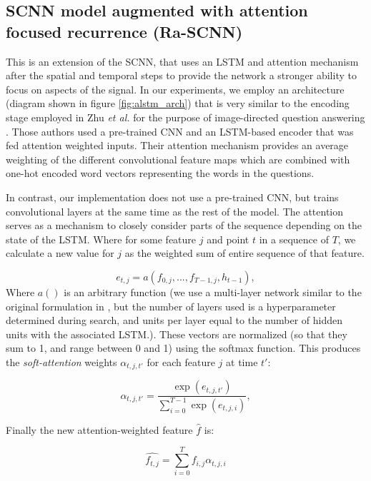\documentclass[fleqn,10pt]{wlscirep}
\begin{document}
\subsection*{SCNN model augmented with attention focused recurrence (Ra-SCNN)} 

This is an extension of the SCNN, that uses an LSTM and attention mechanism after the spatial and temporal steps to provide the network a stronger ability to focus on aspects of the signal. In our experiments, we employ an architecture (diagram shown in figure \ref{fig:alstm_arch}) that is very similar to the encoding stage employed in Zhu {\em et al.} for the purpose of image-directed question answering \cite{Zhu}. Those authors used a pre-trained CNN and an LSTM-based encoder that was fed attention weighted inputs. Their attention mechanism provides an average weighting of the different convolutional feature maps which are combined with one-hot encoded word vectors representing the words in the questions.

In contrast, our implementation does not use a pre-trained CNN, but trains convolutional layers at the same time as the rest of the model. The attention serves as a mechanism to closely consider parts of the sequence depending on the state of the LSTM. Where for some feature $j$ and point $t$ in a sequence of $T$, we calculate a new value for $j$ as the weighted sum of entire sequence of that feature.  

\begin{equation} 
  e_{t, j} = a(f_{0, j},..., f_{T-1, j}, h_{t-1}),
\end{equation}
Where $a()$ is an arbitrary function (we use a multi-layer network similar to the original formulation in \cite{XuKELVINXU}, but the number of layers used is a hyperparameter determined during search, and units per layer equal to the number of hidden units with the associated LSTM.). These vectors are normalized (so that they sum to 1, and range between 0 and 1) using the softmax function. This produces the {\em soft-attention} weights $\alpha_{t,j,t'}$ for each feature $j$ at time $t'$:

\begin{equation} \label{eq:attn_nrg}
  \alpha_{t,j,t'} =  \frac{\exp(e_{t,j,t'})}{\sum_{i=0}^{T-1}\exp(e_{t,j,i})},
\end{equation}

Finally the new attention-weighted feature $\hat{f}$ is: 

\begin{equation} \label{eq:attn}
    \hat{f_{t,j}} = \sum_{i=0}^{T} f_{i,j} \alpha_{t,j,i}
\end{equation}
\end{document}
